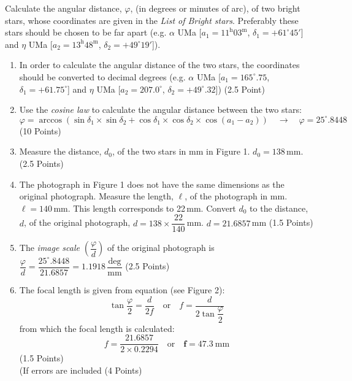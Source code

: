 Calculate the angular distance, $\varphi$, (in degrees or minutes of arc),
of two bright stars, whose coordinates are given in the \emph{List of Bright
stars}. Preferably these stars should be chosen to be far apart (e.g.
$\alpha$ UMa [$a_1 = 11^{\mathrm{h}}03^{\mathrm{m}}$,
$\delta_1 = +61^\circ 45'$] and $\eta$ UMa
[$a_2 = 13^{\mathrm{h}}48^{\mathrm{m}}$, $\delta_2 = +49^\circ 19'$]).


\begin{enumerate}
\item In order to calculate the angular distance of the two stars, the
coordinates should be converted to decimal degrees (e.g. $\alpha$ UMa
[$a_1 = 165^\circ.75$, $\delta_1 = +61.75^\circ$] and $\eta$ UMa
[$a_2 = 207.0^\circ$, $\delta_2 = +49^\circ.32$]) \hfill(2.5 Point)

\item Use the \emph{cosine law} to calculate the angular distance between
the two stars:
\[ \varphi = \arccos(\sin\delta_1 \times \sin\delta_2
   + \cos\delta_1 \times \cos\delta_2 \times \cos(a_1 - a_2))
   \quad\rightarrow\quad \varphi = 25^\circ.8448 \]
\hfill(10 Points)

\item Measure the distance, $d_0$, of the two stars in mm in Figure 1.
$d_0 = 138$\,mm. \hfill(2.5 Points)

\item The photograph in Figure 1 does not have the same dimensions as the
original photograph. Measure the length, $\ell$, of the photograph in mm.
$\ell = 140$\,mm. This length corresponds to 22\,mm. Convert $d_0$ to the
distance, $d$, of the original photograph,
$d = 138 \times \dfrac{22}{140}$\,mm. $d = 21.6857$\,mm \hfill(1.5 Points)

\item %
The \emph{image scale} $\left(\dfrac{\varphi}{d}\right)$ of the original
photograph is
$\dfrac{\varphi}{d} = \dfrac{25^\circ.8448}{21.6857}
 = 1.1918\,\dfrac{\mathrm{deg}}{\mathrm{mm}}$ \hfill(2.5 Points)

\item The focal length is given from equation (see Figure 2):
\[ \tan\frac{\varphi}{2} = \frac{d}{2f}
   \quad\text{or}\quad
   f = \frac{d}{2\tan\dfrac{\varphi}{2}} \]
from which the focal length is calculated:
\[ f = \frac{21.6857}{2 \times 0.2294}
   \quad\text{or}\quad
   \mathbf{f = 47.3\ \mathrm{mm}} \]
\hfill(1.5 Points)\\
(If errors are included \hfill(4 Points)
\end{enumerate}
